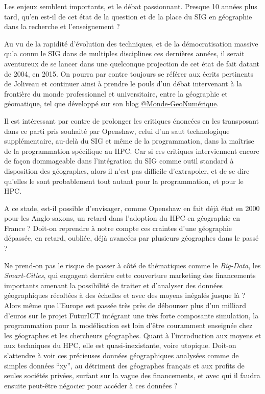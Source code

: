 Les enjeux semblent importants, et le débat passionnant. Presque 10 années plus tard, qu'en est-il de cet état de la question et de la place du SIG en géographie dans la recherche et l'enseignement ?

Au vu de la rapidité d'évolution des techniques, et de la démocratisation massive qu'a connu le SIG dans de multiples disciplines ces dernières années, il serait aventureux de se lancer dans une quelconque projection de cet état de fait datant de 2004, en 2015. On pourra par contre toujours se référer aux écrits pertinents de Joliveau et continuer ainsi à prendre le pouls d'un débat intervenant à la frontière du monde professionnel et universitaire, entre la géographie et géomatique, tel que développé sur son blog \href{https://mondegeonumerique.wordpress.com/}{@Monde-GeoNumérique}.

Il est intéressant par contre de prolonger les critiques énoncées en les transposant dans ce parti pris souhaité par Openshaw, celui d'un saut technologique supplémentaire, au-delà du SIG et même de la programmation, dans la maîtrise de la programmation spécifique au HPC. Car si ces critiques interviennent encore de façon dommageable dans l'intégration du SIG comme outil standard à disposition des géographes, alors il n'est pas difficile d'extrapoler, et de se dire qu'elles le sont probablement tout autant pour la programmation, et pour le HPC.

A ce stade, est-il possible d'envisager, comme Openshaw en fait déjà état en 2000 pour les Anglo-saxons, un retard dans l'adoption du HPC en géographie en France ? Doit-on reprendre à notre compte ces craintes d'une géographie dépassée, en retard, oubliée, déjà avancées par plusieurs géographes dans le passé ?

Ne prend-on pas le risque de passer à côté de thématiques comme le \textit{Big-Data}, les \textit{Smart-Cities}, qui engagent derrière cette couverture marketing des financements importants amenant la possibilité de traiter et d’analyser des données géographiques récoltées à des échelles et avec des moyens inégalés jusque là ? Alors même que l’Europe est passée très près de débourser plus d'un milliard d’euros sur le projet FuturICT intégrant une très forte composante simulation, la programmation pour la modélisation est loin d’être couramment enseignée chez les géographes et les chercheurs géographes. Quant à l'introduction aux moyens et aux techniques du HPC, elle est quasi-inexistante, voire utopique. Doit-on s’attendre à voir ces précieuses données géographiques analysées comme de simples données \enquote{xy}, au détriment des géographes français et aux profits de seules sociétés privées, surfant sur la vague des financements, et avec qui il faudra ensuite peut-être négocier pour accéder à ces données ?

